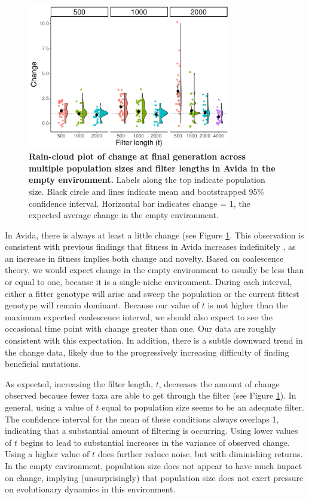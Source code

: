 \documentclass[letterpaper]{article}
\begin{document}
\begin{figure}
    \centering
    \includegraphics[width=3.5in]{figs/dolson.avida_filter_change_end.png}
    \caption{\textbf{Rain-cloud plot of change at final generation across multiple population sizes and filter lengths in Avida in the empty environment.} Labels along the top indicate population size. Black circle and lines indicate mean and bootstrapped 95\% confidence interval. Horizontal bar indicates change = 1, the expected average change in the empty environment.    \label{fig:avida_filter_change}}
\end{figure}

In Avida, there is always at least a little change (see Figure \ref{fig:avida_filter_change}. This observation is consistent with previous findings that fitness in Avida increases indefinitely \citep{wiser_analysis_2015}, as an increase in fitness implies both change and novelty. Based on coalescence theory, we would expect change in the empty environment to usually be less than or equal to one, because it is a single-niche environment. During each interval, either a fitter genotype will arise and sweep the population or the current fittest genotype will remain dominant. Because our value of $t$ is not higher than the maximum expected coalescence interval, we should also expect to see the occasional time point with change greater than one. Our data are roughly consistent with this expectation. In addition, there is a subtle downward trend in the change data, likely due to the progressively increasing difficulty of finding beneficial mutations.

As expected, increasing the filter length, $t$, decreases the amount of change observed because fewer taxa are able to get through the filter (see Figure \ref{fig:avida_filter_change}). In general, using a value of $t$ equal to population size seems to be an adequate filter. The confidence interval for the mean of these conditions always overlaps 1, indicating that a substantial amount of filtering is occurring. Using lower values of $t$ begins to lead to substantial increases in the variance of observed change. Using a higher value of $t$ does further reduce noise, but with diminishing returns. In the empty environment, population size does not appear to have much impact on change, implying (unsurprisingly) that population size does not exert pressure on evolutionary dynamics in this environment.
\end{document}
